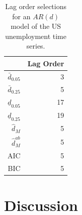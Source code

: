 \documentclass[12pt]{article}\usepackage[]{graphicx}\usepackage[]{color}
\newcommand{\dhatm}{\hat{d}_M}
\newcommand{\dhatmab}{\hat{d}^{ab}_M}
\begin{document}
\begin{table}[ht]
\centering
\begin{tabular}{rr}
  \hline
 & Lag Order \\ 
  \hline
$\bar{d}_{0.05}$ &   3 \\ 
  $\bar{d}_{0.25}$ &   5 \\ 
  $\underline{d}_{0.05}$ &  17 \\ 
  $\underline{d}_{0.25}$ &  19 \\ 
  $\dhatm$ &   5 \\ 
  $\dhatmab$ &   5 \\ 
  AIC &   5 \\ 
  BIC &   5 \\ 
   \hline
\end{tabular}
\caption{Lag order selections for an $AR(d)$ model of the US unemployment time series.} 
\label{tab:ts}
\end{table}


\section{Discussion}\label{sec:discussion}
\end{document}
